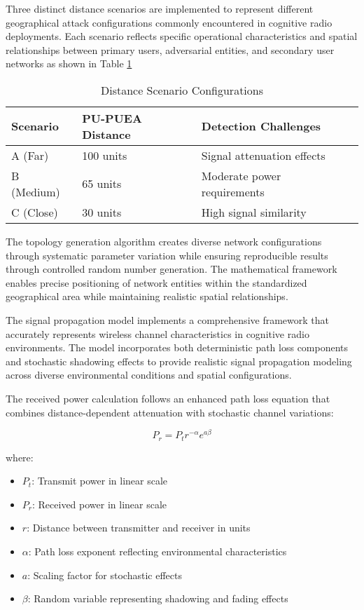 Three distinct distance scenarios are implemented to represent different geographical attack configurations commonly encountered in cognitive radio deployments. Each scenario reflects specific operational characteristics and spatial relationships between primary users, adversarial entities, and secondary user networks as shown in Table \ref{tab:scenarios}

\begin{table}[h]
\centering
\caption{Distance Scenario Configurations}
\label{tab:scenarios}
\begin{tabular}{|l|l|l|l|}
\hline
\textbf{Scenario} & \textbf{PU-PUEA Distance} & \textbf{Detection Challenges} \\
\hline
A (Far) & 100 units & Signal attenuation effects \\
B (Medium) & 65 units & Moderate power requirements \\
C (Close) & 30 units & High signal similarity \\
\hline
\end{tabular}
\end{table}

The topology generation algorithm creates diverse network configurations through systematic parameter variation while ensuring reproducible results through controlled random number generation. The mathematical framework enables precise positioning of network entities within the standardized geographical area while maintaining realistic spatial relationships.

The signal propagation model implements a comprehensive framework that accurately represents wireless channel characteristics in cognitive radio environments. The model incorporates both deterministic path loss components and stochastic shadowing effects to provide realistic signal propagation modeling across diverse environmental conditions and spatial configurations.

The received power calculation follows an enhanced path loss equation that combines distance-dependent attenuation with stochastic channel variations:

\begin{equation}
P_r = P_t r^{-\alpha} e^{a\beta}
\end{equation}

where:
\begin{itemize}
\item $P_t$: Transmit power in linear scale
\item $P_r$: Received power in linear scale
\item $r$: Distance between transmitter and receiver in units
\item $\alpha$: Path loss exponent reflecting environmental characteristics
\item $a$: Scaling factor for stochastic effects
\item $\beta$: Random variable representing shadowing and fading effects
\end{itemize}

